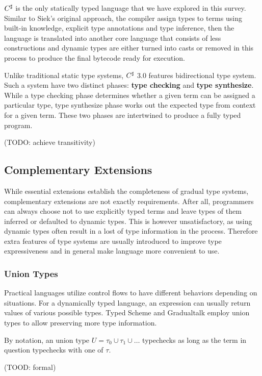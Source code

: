 $C^\sharp$ is the only statically typed language that we have explored in this survey.
Similar to Siek's original approach, the compiler assign types to terms using built-in knowledge,
explicit type annotations and type inference, then the language is translated into another core
language that consists of less constructions and dynamic types are either turned into
casts or removed in this process to produce the final bytecode ready for execution.

Unlike traditional static type systems, $C^\sharp$ 3.0 features bidirectional type system.
Such a system have two distinct phases: \textbf{type checking} and \textbf{type synthesize}.
While a type checking phase determines whether a given term can be assigned a particular type,
type synthesize phase works out the expected type from context for a given term. These two phases
are intertwined to produce a fully typed program.

(TODO: achieve transitivity)

\subsection{Complementary Extensions}

While essential extensions establish the completeness of gradual type systems,
complementary extensions are not exactly requirements.
After all, programmers can always choose not to use explicitly typed terms and 
leave types of them inferred or defaulted to dynamic types.
This is however unsatisfactory, as using dynamic types often result in a lost of type information in the process.
Therefore extra features of type systems are usually introduced to improve type expressiveness and 
in general make language more convenient to use.

\subsubsection{Union Types}

Practical languages utilize control flows to have different behaviors depending on situations.
For a dynamically typed language, an expression can usually return values of various possible types.
Typed Scheme and Gradualtalk employ union types to allow preserving more type information.

By notation, an union type $U = \tau_0 \cup \tau_1 \cup \ldots$ typechecks as long as the term in question
typechecks with one of $\tau$.

(TOOD: formal)

